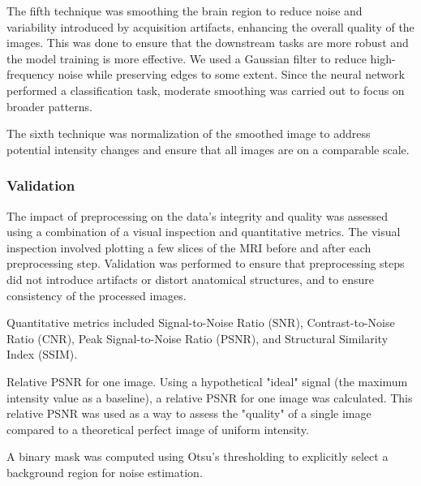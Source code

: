The fifth technique was smoothing the brain region to reduce noise and variability introduced by acquisition artifacts, enhancing the overall quality of the images. This was done to ensure that the downstream tasks are more robust and the model training is more effective. We used a Gaussian filter to reduce high-frequency noise while preserving edges to some extent. Since the neural network performed a classification task, moderate smoothing was carried out to focus on broader patterns.

The sixth technique was normalization of the smoothed image to address potential intensity changes and ensure that all images are on a comparable scale.

\subsubsection{Validation}

The impact of preprocessing on the data's integrity and quality was assessed using a combination of a visual inspection and quantitative metrics. The visual inspection involved plotting a few slices of the MRI before and after each preprocessing step. Validation was performed to ensure that preprocessing steps did not introduce artifacts or distort anatomical structures, and to ensure consistency of the processed images.

Quantitative metrics included Signal-to-Noise Ratio (SNR), Contrast-to-Noise Ratio (CNR), Peak Signal-to-Noise Ratio (PSNR), and 
Structural Similarity Index (SSIM). 

Relative PSNR for one image. Using a hypothetical "ideal" signal (the maximum intensity value as a baseline), a relative PSNR for one image was calculated. This relative PSNR was used as a way to assess the "quality" of a single image compared to a theoretical perfect image of uniform intensity.

A binary mask was computed using Otsu's thresholding to explicitly select a background region for noise estimation.


